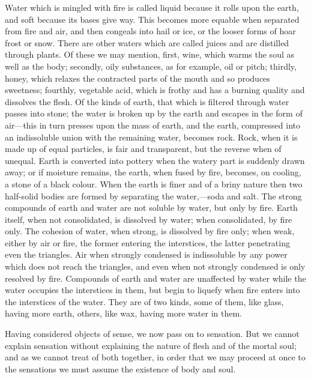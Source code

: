 \documentclass[11pt,letter]{article}
\begin{document}
\par  Water which is mingled with fire is called liquid because it rolls upon the earth, and soft because its bases give way. This becomes more equable when separated from fire and air, and then congeals into hail or ice, or the looser forms of hoar frost or snow. There are other waters which are called juices and are distilled through plants. Of these we may mention, first, wine, which warms the soul as well as the body; secondly, oily substances, as for example, oil or pitch; thirdly, honey, which relaxes the contracted parts of the mouth and so produces sweetness; fourthly, vegetable acid, which is frothy and has a burning quality and dissolves the flesh. Of the kinds of earth, that which is filtered through water passes into stone; the water is broken up by the earth and escapes in the form of air—this in turn presses upon the mass of earth, and the earth, compressed into an indissoluble union with the remaining water, becomes rock. Rock, when it is made up of equal particles, is fair and transparent, but the reverse when of unequal. Earth is converted into pottery when the watery part is suddenly drawn away; or if moisture remains, the earth, when fused by fire, becomes, on cooling, a stone of a black colour. When the earth is finer and of a briny nature then two half-solid bodies are formed by separating the water,—soda and salt. The strong compounds of earth and water are not soluble by water, but only by fire. Earth itself, when not consolidated, is dissolved by water; when consolidated, by fire only. The cohesion of water, when strong, is dissolved by fire only; when weak, either by air or fire, the former entering the interstices, the latter penetrating even the triangles. Air when strongly condensed is indissoluble by any power which does not reach the triangles, and even when not strongly condensed is only resolved by fire. Compounds of earth and water are unaffected by water while the water occupies the interstices in them, but begin to liquefy when fire enters into the interstices of the water. They are of two kinds, some of them, like glass, having more earth, others, like wax, having more water in them.

\par  Having considered objects of sense, we now pass on to sensation. But we cannot explain sensation without explaining the nature of flesh and of the mortal soul; and as we cannot treat of both together, in order that we may proceed at once to the sensations we must assume the existence of body and soul.
\end{document}
